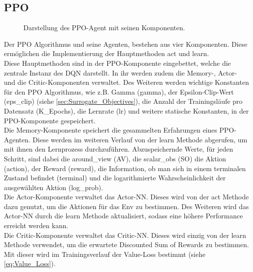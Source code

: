 \subsection{PPO} \label{sec:Konzept_PPO}
\begin{figure}[H]
	\centering
	\def\svgscale{0.18}
	
	\caption[PPO-Agent]{Darstellung des PPO-Agent mit seinen Komponenten.}
	\label{fig:PPO-Agent}
\end{figure}
Der PPO Algorithmus und seine Agenten, bestehen aus vier Komponenten. Diese ermöglichen die Implementierung der Hauptmethoden act und learn.\\
Diese Hauptmethoden sind in der PPO-Komponente eingebettet, welche die zentrale Instanz des DQN darstellt. In ihr werden zudem die Memory-, Actor- und die Critic-Komponenten verwaltet. Des Weiteren werden wichtige Konstanten für den PPO Algorithmus, wie z.B. Gamma (gamma), der Epsilon-Clip-Wert (eps\_clip) (siehe \ref{sec:Surrogate_Objectives}), die Anzahl der Trainingsläufe pro Datensatz (K\_Epochs), die Lernrate (lr) und weitere statische Konstanten, in der PPO-Komponente gespeichert.\\
Die Memory-Komponente speichert die gesammelten Erfahrungen eines PPO-Agenten. Diese werden im weiteren Verlauf von der learn Methode abgerufen, um mit ihnen den Lernprozess durchzuführen. Abzuspeichernde Werte, für jeden Schritt, sind dabei die around\_view (AV), die scalar\_obs (SO) die Aktion (action), der Reward (reward), die Information, ob man sich in einem terminalen Zustand befindet (terminal) und die logarithmierte Wahrscheinlichkeit der ausgewählten Aktion (log\_prob).\\
Die Actor-Komponente verwaltet das Actor-NN. Dieses wird von der act Methode dazu genutzt, um die Aktionen für das Env zu bestimmen. Des Weiteren wird das Actor-NN durch die learn Methode aktualisiert, sodass eine höhere Performance erreicht werden kann.\\
Die Critic-Komponente verwaltet das Critic-NN. Dieses wird einzig von der learn Methode verwendet, um die erwartete Discounted Sum of Rewards zu bestimmen. Mit dieser wird im Trainingsverlauf der Value-Loss bestimmt (siehe \ref{eq:Value_Loss}).

